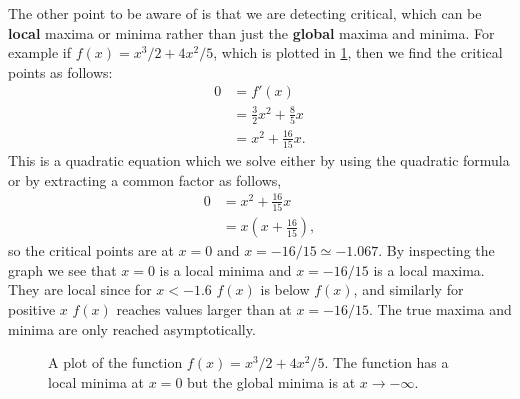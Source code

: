 The other point to be aware of is that we are detecting critical, which can be \textbf{local} maxima or minima rather than just the \textbf{global} maxima and minima. For example if $f(x)=x^{3}/2 +4x^{2}/5$, which is plotted in \cref{fig: crit points 3}, then we find the critical points as follows:
\begin{align*}
0	&=f'(x)\\
	&=\frac{3}{2}x^{2}+\frac{8}{5}x\\
	&=x^{2}+\frac{16}{15}x.
\end{align*}
This is a quadratic equation which we solve either by using the quadratic formula or by extracting a common factor as follows,
\begin{align*}
0	&=x^{2}+\frac{16}{15}x\\
	&=x\left(x+\frac{16}{15}\right),
\end{align*}
so the critical points are at $x=0$ and $x=-16/15\simeq -1.067$. By inspecting the graph we see that $x=0$ is a local minima and $x=-16/15$ is a local maxima. They are local since for $x<-1.6$ $f(x)$ is below $f(x)$, and similarly for positive $x$ $f(x)$ reaches values larger than at $x=-16/15$. The true maxima and minima are only reached asymptotically.\\

\begin{figure}[ht]
    \centering
{}
    \caption{A plot of the function $f(x)=x^{3}/2 +4x^{2}/5$. The function has a local minima at $x=0$ but the global minima is at $x\to -\infty$. }
        \label{fig: crit points 3}
\end{figure}

